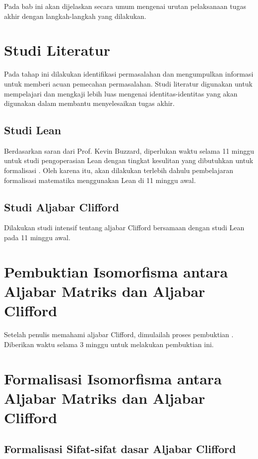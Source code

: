 Pada bab ini akan dijelaskan secara umum mengenai urutan pelaksanaan tugas akhir dengan langkah-langkah yang dilakukan.

\section{Studi Literatur}

Pada tahap ini dilakukan identifikasi permasalahan dan mengumpulkan informasi untuk memberi acuan pemecahan permasalahan. Studi literatur digunakan untuk mempelajari dan mengkaji lebih luas mengenai identitas-identitas yang akan digunakan dalam membantu menyelesaikan tugas akhir.

\subsection{Studi Lean}

Berdasarkan saran dari Prof. Kevin Buzzard, diperlukan waktu selama 11 minggu untuk studi pengoperasian Lean dengan tingkat kesulitan yang dibutuhkan untuk formalisasi \icm{}. Oleh karena itu, akan dilakukan terlebih dahulu pembelajaran formalisasi matematika menggunakan Lean di 11 minggu awal.

\subsection{Studi Aljabar Clifford}

Dilakukan studi intensif tentang aljabar Clifford bersamaan dengan studi Lean pada 11 minggu awal.

\section{Pembuktian Isomorfisma antara Aljabar Matriks dan Aljabar Clifford}

Setelah penulis memahami aljabar Clifford, dimulailah proses pembuktian \icm{}. Diberikan waktu selama 3 minggu untuk melakukan pembuktian ini.

\section{Formalisasi Isomorfisma antara Aljabar Matriks dan Aljabar Clifford}

\subsection{Formalisasi Sifat-sifat dasar Aljabar Clifford}

